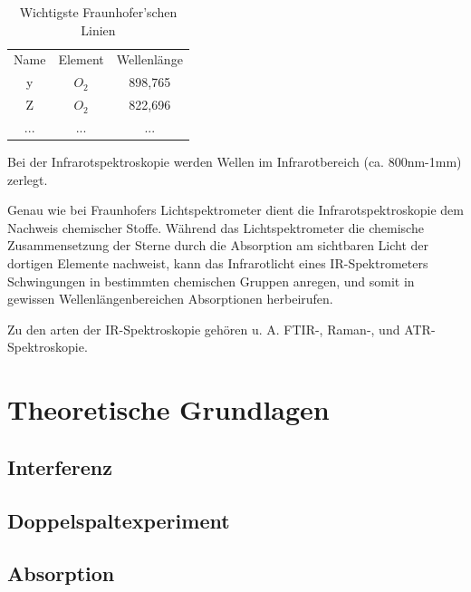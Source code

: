 \documentclass{article}
\begin{document}
\begin{table}
    \label{tab:wichtige-fraunhoferlinien}
    \begin{tabular}{|c|c|c|}
        \hline
        Name & Element & Wellenlänge \\
        y    & $O_2$    & 898,765    \\
        Z    & $O_2$    & 822,696    \\
        ...  & ...      & ...        \\ %
        \hline
    \end{tabular}
    \caption{Wichtigste Fraunhofer'schen Linien}
\end{table}

Bei der Infrarotspektroskopie werden Wellen im Infrarotbereich (ca. 800nm-1mm) zerlegt.

Genau wie bei Fraunhofers Lichtspektrometer dient die Infrarotspektroskopie dem Nachweis chemischer Stoffe. Während das Lichtspektrometer die chemische Zusammensetzung der Sterne durch die Absorption am sichtbaren Licht der dortigen Elemente nachweist, kann das Infrarotlicht eines IR-Spektrometers Schwingungen in bestimmten chemischen Gruppen anregen, und somit in gewissen Wellenlängenbereichen Absorptionen herbeirufen.

Zu den arten der IR-Spektroskopie gehören u. A. FTIR-, Raman-, und ATR-Spektroskopie.

\newpage
\section{Theoretische Grundlagen}


\subsection{Interferenz}


\subsection{Doppelspaltexperiment}


\subsection{Absorption}
\end{document}

